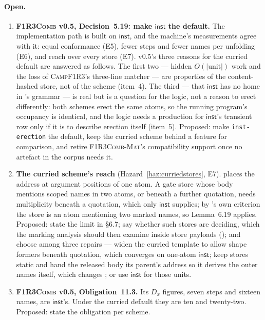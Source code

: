 \documentclass[11pt,a4paper]{article}
\newcommand{\code}[1]{\texttt{#1}}
\newcommand{\Comb}{\textsc{F1R3Comb}}
\newcommand{\Mat}{\textsc{F1R3Comb-Mat}}
\newcommand{\Camp}{\textsc{CampF1R3}}
\theoremstyle{definition}
\theoremstyle{plain}
\newcommand{\inst}{\mathsf{inst}}
\begin{document}
\paragraph{Open.}
\begin{enumerate}[leftmargin=1.8em]

\item \textbf{\Comb{} v0.5, Decision~5.19: make $\inst$ the default.} The
implementation path is built on $\inst$, and the machine's measurements agree
with it: equal conformance (E5), fewer steps and fewer names per unfolding
(E6), and reach over every store (E7). v0.5's three reasons for the curried
default are answered as follows. The first two --- hidden
$O(|\mathrm{unit}|)$ work and the loss of \Camp's three-line matcher --- are
properties of the content-hashed store, not of the scheme (item~4). The third
--- that $\inst$ has no home in \cite{logic}'s grammar --- is real but is a
question for the logic, not a reason to erect differently: both schemes erect
the same atoms, so the running program's occupancy is identical, and the
logic needs a production for $\inst$'s transient row only if it is to describe
erection itself (item~5). Proposed: make \code{inst-erection} the default,
keep the curried scheme behind a feature for comparison, and retire
\Mat's compatibility support once no artefact in the corpus needs it.

\item \textbf{The curried scheme's reach} (Hazard~\ref{haz:curriedstores},
E7). \cite[\S6.7]{draft3} places the address at argument positions of one
atom. A gate store whose body mentions scoped names in two atoms, or beneath a
further quotation, needs multiplicity beneath a quotation, which only
$\inst$ supplies; by \cite[Rem.~6.20]{draft3}'s own criterion the store is an
atom mentioning two marked names, so Lemma~6.19 applies. Proposed: state the
limit in \S6.7; say whether such stores are deciding, which the marking
analysis should then examine inside store payloads (\cite[Req.~5.17]{combspec});
and choose among three repairs --- widen the curried template to allow shape
formers beneath quotation, which converges on one-atom $\inst$; keep stores
static and hand the released body its parent's address so it derives the
outer names itself, which changes \cite[Req.~5.11]{combspec}; or use $\inst$
for those units.

\item \textbf{\Comb{} v0.5, Obligation~11.3.} Its $D_{x}$ figures, seven
steps and sixteen names, are $\inst$'s. Under the curried default they are ten
and twenty-two. Proposed: state the obligation per scheme.


\end{enumerate}
\end{document}
